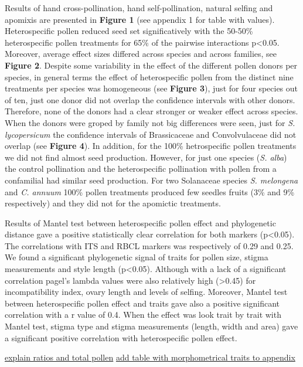 \documentclass[11pt,a4paper]{article}
\begin{document}
Results of hand cross-pollination, hand self-pollination, natural
selfing and apomixis are presented in \textbf{Figure 1} (see appendix 1
for table with values). Heterospecific pollen reduced seed set
significatively with the 50-50\% heterospecific pollen treatments for
65\% of the pairwise interactions p\textless{}0.05. Moreover, average
effect sizes differed across species and across families, see
\textbf{Figure 2}. Despite some variability in the effect of the
different pollen donors per species, in general terms the effect of
heterospecific pollen from the distinct nine treatments per species was
homogeneous (see \textbf{Figure 3}), just for four species out of ten,
just one donor did not overlap the confidence intervals with other
donors. Therefore, none of the donors had a clear stronger or weaker
effect across species. When the donors were groped by family not big
differences were seen, just for \emph{S. lycopersicum} the confidence
intervals of Brassicaceae and Convolvulaceae did not overlap (see
\textbf{Figure 4}). In addition, for the 100\% hetrospecific pollen
treatments we did not find almost seed production. However, for just one
species (\emph{S. alba}) the control pollination and the heterospecific
pollination with pollen from a confamilial had similar seed production.
For two Solanaceae species \emph{S. melongena} and \emph{C. annuum}
100\% pollen treatments produced few seedles fruits (3\% and 9\%
respectively) and they did not for the apomictic treatments.

Results of Mantel test between heterospecific pollen effect and
phylogenetic distance gave a positive statistically clear correlation
for both markers (p\textless{}0.05). The correlations with ITS and RBCL
markers was respectively of 0.29 and 0.25. We found a significant
phylogenetic signal of traits for pollen size, stigma measurements and
style length (p\textless{}0.05). Although with a lack of a significant
correlation pagel's lambda values were also relatively high
(\textgreater{}0.45) for incompatibility index, ovary length and levels
of selfing. Moreover, Mantel test between heterospecific pollen effect
and traits gave also a positive significant correlation with a r value
of 0.4. When the effect was look trait by trait with Mantel test, stigma
type and stigma measurements (length, width and area) gave a significant
positive correlation with heterospecific pollen effect.

\href{Jose}{explain ratios and total pollen} \href{}{add table with
morphometrical traits to appendix}
\end{document}
